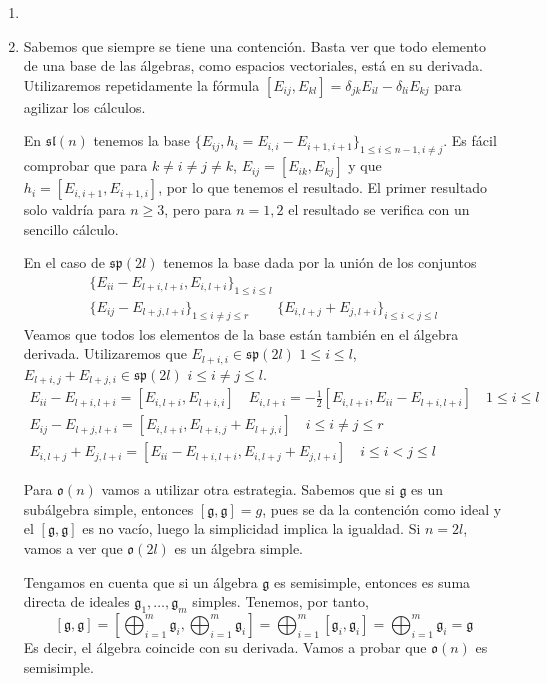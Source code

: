\documentclass[twoside]{article}
\begin{document}
\begin{solucion}
\begin{enumerate}
\item[]
\item Sabemos que siempre se tiene una contención. Basta ver que todo elemento de una base de las álgebras, como espacios vectoriales, está en su derivada. Utilizaremos repetidamente la fórmula $[E_{ij},E_{kl}]=\delta_{jk}E_{il}-\delta_{li}E_{kj}$ para agilizar los cálculos.

En $\mathfrak{sl}(n)$ tenemos la base $\{E_{ij}, h_i=E_{i,i}-E_{i+1,i+1}\}_{1\leq i\leq n-1, i\neq j}$. Es fácil comprobar que para $k\neq i\neq j\neq k$, $E_{ij}=[E_{ik},E_{kj}]$ y que $h_i=[E_{i,i+1},E_{i+1,i}]$, por lo que tenemos el resultado. El primer resultado solo valdría para $n\geq 3$, pero para $n=1,2$ el resultado se verifica con un sencillo cálculo.

En el caso de $\mathfrak{sp}(2l)$ tenemos la base dada por la unión de los conjuntos
\begin{gather*}
\{E_{ii}-E_{l+i,l+i}, E_{i,l+i}\}_{1\leq i \leq l} \\
\{E_{ij}-E_{l+j,l+i}\}_{1\leq i\neq j\leq r} \qquad \{E_{i,l+j}+E_{j,l+i}\}_{i\leq i<j\leq l}
\end{gather*}
Veamos que todos los elementos de la base están también en el álgebra derivada. Utilizaremos que $E_{l+i,i} \in \mathfrak{sp}(2l)$ $1\leq i \leq l$, $E_{l+i,j}+E_{l+j,i} \in \mathfrak{sp}(2l)$ $i \leq i\neq j \leq l$.
\begin{gather*}
E_{ii}-E_{l+i,l+i}=[E_{i,l+i},E_{l+i,i}] \quad E_{i,l+i} = -\frac{1}{2}[E_{i,l+i},E_{ii}-E_{l+i,l+i}] \quad 1\leq i \leq l\\
E_{ij}-E_{l+j,l+i}=[E_{i,l+i},E_{l+i,j}+E_{l+j,i}] \quad i \leq i \neq j \leq r\\
E_{i,l+j}+E_{j,l+i}=[E_{ii}-E_{l+i,l+i},E_{i,l+j}+E_{j,l+i}]\quad i \leq i < j \leq l
\end{gather*}

Para $\mathfrak{o}(n)$ vamos a utilizar otra estrategia. Sabemos que si $\mathfrak{g}$ es un subálgebra simple, entonces $[\mathfrak{g},\mathfrak{g}] = g$, pues se da la contención como ideal y el $[\mathfrak{g},\mathfrak{g}]$ es no vacío, luego la simplicidad implica la igualdad. Si $n=2l$, vamos a ver que $\mathfrak{o}(2l)$ es un álgebra simple.




Tengamos en cuenta que si un álgebra $\mathfrak{g}$ es semisimple, entonces es suma directa de ideales $\mathfrak{g}_1,\dotsc,\mathfrak{g}_m$ simples. Tenemos, por tanto,
$$
[\mathfrak{g},\mathfrak{g}] = \left[\bigoplus_{i=1}^m \mathfrak{g}_i,\bigoplus_{i=1}^m \mathfrak{g}_i\right] = \bigoplus_{i=1}^m [\mathfrak{g}_i,\mathfrak{g}_i] =\bigoplus_{i=1}^m \mathfrak{g}_i = \mathfrak{g}
$$
Es decir, el álgebra coincide con su derivada. Vamos a probar que $\mathfrak{o}(n)$ es semisimple.


\end{enumerate}
\end{solucion}
\end{document}
